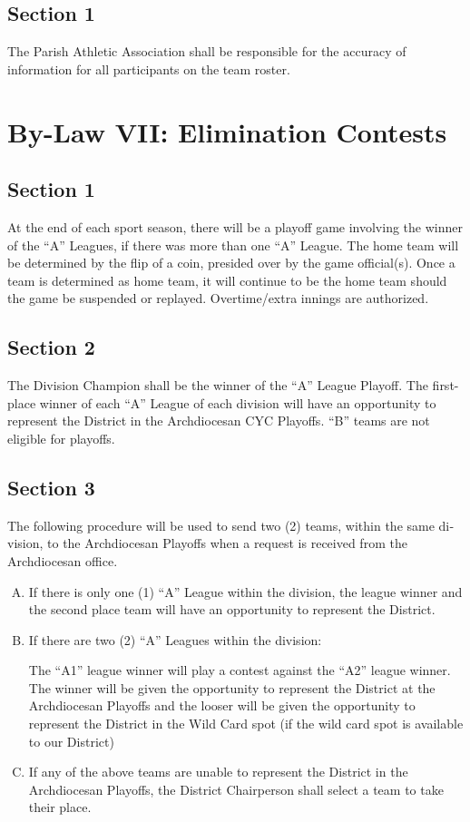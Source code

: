 \documentclass[letteraper,10pt,oneside,draft]{memoir}
\begin{document}
\subsection{Section 1}
The Parish Athletic Association shall be responsible for the accuracy of information for all participants on the team roster.

\section{By-Law VII: Elimination Contests}
\subsection{Section 1}
At the end of each sport season, there will be a playoff game involving the win­ner of the ``A'' Leagues, if there was more than one “A” League.  The home team will be determined by the flip of a coin, pre­sided over by the game official(s).  Once a team is determined as home team, it will continue to be the home team should the game be suspended or replayed.   Overtime/extra innings are authorized.

\subsection{Section 2}
The Division Champion shall be the winner of the ``A'' League Playoff.  The first-place winner of each ``A'' League of each division will have an opportunity to represent the District in the Archdiocesan CYC Playoffs. “B” teams are not eligible for playoffs.

\subsection{Section 3}
The following procedure will be used to send two (2) teams, within the same di­vision, to the Archdiocesan Playoffs when a request is received from the Archdiocesan office.

\begin{enumerate}[A.]
    \item If there is only one (1) ``A'' League within the division, the league winner and the sec­ond place team will have an opportunity to represent the District.
    \item If there are two (2) ``A'' Leagues within the division:
    
    The ``A1'' league winner will play a contest against the “A2” league winner. The winner will be given the opportunity to represent the District at the Archdiocesan Playoffs and the looser will be given the opportunity to represent the District in the Wild Card spot (if the wild card spot is available to our District)

    \item If any of the above teams are unable to represent the District in the Archdiocesan Playoffs, the District Chairperson shall select a team to take their place.
\end{enumerate}
\end{document}
